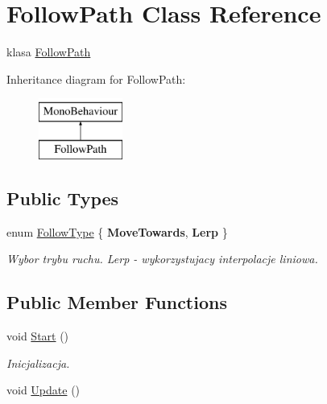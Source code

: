 \hypertarget{class_follow_path}{}\section{Follow\+Path Class Reference}
\label{class_follow_path}


klasa \hyperlink{class_follow_path}{Follow\+Path}  


Inheritance diagram for Follow\+Path\+:\begin{figure}[H]
\begin{center}
\leavevmode
\includegraphics[height=2.000000cm]{class_follow_path}
\end{center}
\end{figure}
\subsection*{Public Types}
\begin{DoxyCompactItemize}
\item 
\hypertarget{class_follow_path_aa15222ed17c7bb53f199e5cb5e5c9cef}{}enum \hyperlink{class_follow_path_aa15222ed17c7bb53f199e5cb5e5c9cef}{Follow\+Type} \{ {\bfseries Move\+Towards}, 
{\bfseries Lerp}
 \}\label{class_follow_path_aa15222ed17c7bb53f199e5cb5e5c9cef}
\begin{DoxyCompactList}\small\item\em Wybor trybu ruchu. Lerp -\/ wykorzystujacy interpolacje liniowa. \end{DoxyCompactList}
\end{DoxyCompactItemize}
\subsection*{Public Member Functions}
\begin{DoxyCompactItemize}
\item 
\hypertarget{class_follow_path_a5e1828cf1cf7744c062a58e4a0d29605}{}void \hyperlink{class_follow_path_a5e1828cf1cf7744c062a58e4a0d29605}{Start} ()\label{class_follow_path_a5e1828cf1cf7744c062a58e4a0d29605}

\begin{DoxyCompactList}\small\item\em Inicjalizacja. \end{DoxyCompactList}\item 
void \hyperlink{class_follow_path_a157ad1da8560085de3542e46050d7183}{Update} ()
\end{DoxyCompactItemize}
